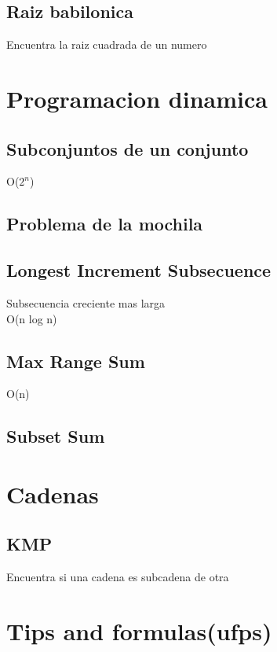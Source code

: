 \documentclass[10pt,landscape,twocolumn,a4paper,notitlepage]{article}
\newcommand\cppfile[2][]{

}
\begin{document}
			\subsection{Raiz babilonica}
			Encuentra la raiz cuadrada de un numero
			\cppfile[4-12]{matematicas/raiz_babilonica.cpp}
			
		\section{Programacion dinamica}
			\subsection{Subconjuntos de un conjunto}
			O($2^{n}$)
			\cppfile[6-17]{programacion_dinamica/bitmask.cpp}
			\subsection{Problema de la mochila}
			\cppfile[8-23]{programacion_dinamica/knapsack.cpp}
			\subsection{Longest Increment Subsecuence}
			Subsecuencia creciente mas larga\\
			O(n log n)
			\cppfile[8-19]{programacion_dinamica/LIS.cpp}
			\subsection{Max Range Sum}
			O(n)
			\cppfile[6-22]{programacion_dinamica/Max_Range_Sum.cpp}
			\subsection{Subset Sum}
			\cppfile[8-20]{programacion_dinamica/Subset_Sum.cpp}
	
		\section{Cadenas}
			\subsection{KMP}
			Encuentra si una cadena es subcadena de otra
			\cppfile[4-30]{cadenas/kmp.cpp}
	
	\newpage
	\section{Tips and formulas(ufps)}
\end{document}
